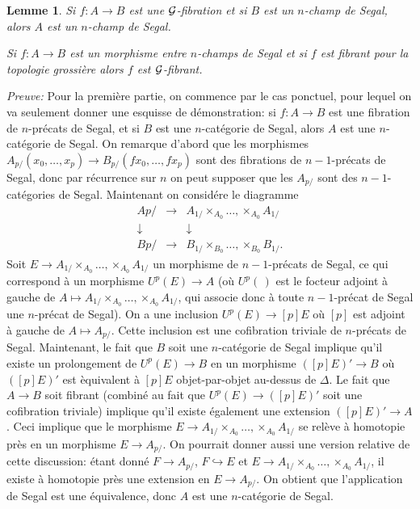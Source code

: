 \documentclass[12pt]{article}
\newtheorem{lemme}[lemma]{Lemme}
\newcommand{\Gg}{{\cal G}}
\begin{document}
\begin{lemme}
\label{stuff}
Si $f: A\rightarrow B$ est une
$\Gg$-fibration et si $B$ est un $n$-champ de Segal, alors $A$ est un
$n$-champ de Segal.

Si $f: A\rightarrow B$ est un morphisme entre $n$-champs
de Segal et si $f$ est fibrant pour la topologie grossi\`ere alors
$f$ est $\Gg$-fibrant.
\end{lemme}
{\em Preuve:}
Pour la premi\`ere partie, on commence par le cas ponctuel, pour lequel on va
seulement donner une esquisse de d\'emonstration:
si $f:A\rightarrow B$ est une fibration de $n$-pr\'ecats de Segal, et si $B$ est
une $n$-cat\'egorie de Segal, alors $A$ est une $n$-cat\'egorie de Segal.
On remarque d'abord que les morphismes
$A_{p/}(x_0,\ldots , x_p)\rightarrow B_{p/}(fx_0,\ldots ,fx_p)$ sont des
fibrations de $n-1$-pr\'ecats de Segal, donc par r\'ecurrence sur $n$ on peut
supposer que les $A_{p/}$ sont des $n-1$-cat\'egories de Segal. Maintenant
on consid\'ere le diagramme $$
\begin{array}{ccc}
A{p/}&\rightarrow &A_{1/}\times _{A_0}\ldots , \times _{A_0}A_{1/}\\
\downarrow && \downarrow \\
B{p/}&\rightarrow &B_{1/}\times _{B_0}\ldots , \times _{B_0}B_{1/}.
\end{array}
$$
Soit $E\rightarrow A_{1/}\times _{A_0}\ldots , \times _{A_0}A_{1/}$
un morphisme de $n-1$-pr\'ecats de Segal,
ce qui correspond \`a un morphisme $U^p(E)\rightarrow A$
(o\`u $U^p(\, )$ est le focteur adjoint \`a gauche de
$A\mapsto A_{1/}\times _{A_0}\ldots , \times
_{A_0}A_{1/}$, qui associe donc \`a toute $n-1$-pr\'ecat de Segal
une $n$-pr\'ecat
de Segal). On a une inclusion $U^p(E)\rightarrow [p]E$ o\`u $[p]$ est
adjoint \`a gauche de $A\mapsto A_{p/}$.
Cette inclusion est une cofibration triviale
de $n$-pr\'ecats de Segal. Maintenant, le fait que $B$ soit une $n$-cat\'egorie
de Segal implique qu'il existe un prolongement de $U^p(E)\rightarrow B$
en un morphisme $([p]E)'\rightarrow B$ o\`u $([p]E)'$ est \`equivalent \`a
$[p]E$ objet-par-objet au-dessus de $\Delta$. Le fait que $A\rightarrow B$
soit fibrant (combin\'e au fait que $U^p(E)\rightarrow ([p]E)'$ soit une
cofibration triviale) implique qu'il existe \'egalement une extension
$([p]E)'\rightarrow A$. Ceci implique que le morphisme $E\rightarrow
A_{1/}\times _{A_0}\ldots , \times _{A_0}A_{1/}$ se rel\`eve \`a homotopie
pr\`es en un morphisme $E\rightarrow A_{p/}$. On pourrait donner aussi une
version relative de cette discussion: \'etant donn\'e $F\rightarrow A_{p/}$,
$F\hookrightarrow E$ et $E\rightarrow A_{1/}\times _{A_0}\ldots , \times
_{A_0}A_{1/}$, il existe \`a homotopie pr\`es une extension en $E\rightarrow
A_{p/}$. On obtient que l'application de Segal est une \'equivalence, donc $A$
est une $n$-cat\'egorie de Segal.
\end{document}
